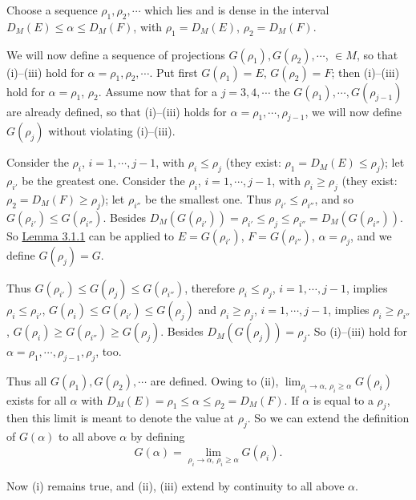 \documentclass[twoside,leqno]{article}
\newcommand{\DM}{D_{M}}
\newcommand{\StatementRef}[2]{\hyperlink{stmt:#1}{#2}}
\begin{document}
Choose a sequence $\rho_1,\rho_2,\cdots$ which lies and is dense in the interval
$\DM(E)\leq\alpha\leq\DM(F)$, with $\rho_1=\DM(E)$, $\rho_2=\DM(F)$.

We will now define a sequence of projections $G(\rho_1),G(\rho_2),\cdots$, $\in M$, so
that (i)--(iii) hold for $\alpha=\rho_1,\rho_2,\cdots$. Put first $G(\rho_1)=E$,
$G(\rho_2)=F$; then (i)--(iii) hold for $\alpha=\rho_1$, $\rho_2$. Assume now that for a
$j=3,4,\cdots$ the $G(\rho_1),\cdots,G(\rho_{j-1})$ are already defined, so that
(i)--(iii) holds for $\alpha=\rho_1,\cdots,\rho_{j-1}$, we will now define
$G(\rho_j)$ without violating (i)--(iii).

Consider the $\rho_i$, $i=1,\cdots,j-1$, with $\rho_i\leq\rho_j$ (they exist:
$\rho_1=\DM(E)\leq\rho_j$); let $\rho_{i'}$ be the greatest one. Consider the $\rho_i$,
$i=1,\cdots,j-1$, with $\rho_i\geq\rho_j$ (they exist:
$\rho_2=\DM(F)\geq\rho_j$); let $\rho_{i''}$ be the smallest one. Thus
$\rho_{i'}\leq\rho_{i''}$, and so $G(\rho_{i'})\leq G(\rho_{i''})$. Besides
$\DM(G(\rho_{i'}))=\rho_{i'}\leq\rho_j\leq\rho_{i''}=\DM(G(\rho_{i''}))$.
So \StatementRef{lemma:3.1.1}{Lemma 3.1.1} can be applied to
$E=G(\rho_{i'})$, $F=G(\rho_{i''})$, $\alpha=\rho_j$, and we define $G(\rho_j)=G$.

Thus $G(\rho_{i'})\leq G(\rho_j)\leq G(\rho_{i''})$, therefore
$\rho_i\leq\rho_j$, $i=1,\cdots,j-1$, implies
$\rho_i\leq\rho_{i'}$, $G(\rho_i)\leq G(\rho_{i'})\leq G(\rho_j)$ and
$\rho_i\geq\rho_j$, $i=1,\cdots,j-1$, implies
$\rho_i\geq\rho_{i''}$, $G(\rho_i)\geq G(\rho_{i''})\geq G(\rho_j)$.
Besides $\DM(G(\rho_j))=\rho_j$. So (i)--(iii) hold for
$\alpha=\rho_1,\cdots,\rho_{j-1},\rho_j$, too.

Thus all $G(\rho_1),G(\rho_2),\cdots$ are defined. Owing to (ii),
$\lim_{\rho_i\to\alpha,\,\rho_i\geq\alpha}G(\rho_i)$ exists for all $\alpha$ with
$\DM(E)=\rho_1\leq\alpha\leq\rho_2=\DM(F)$. If $\alpha$ is equal to a $\rho_j$, then this
limit is meant to denote the value at $\rho_j$. So we can extend the definition of
$G(\alpha)$ to all above $\alpha$ by defining
\[
 G(\alpha)=\lim_{\rho_i\to\alpha,\,\rho_i\geq\alpha}G(\rho_i).
\]

Now (i) remains true, and (ii), (iii) extend by continuity to all above $\alpha$.
\end{document}
